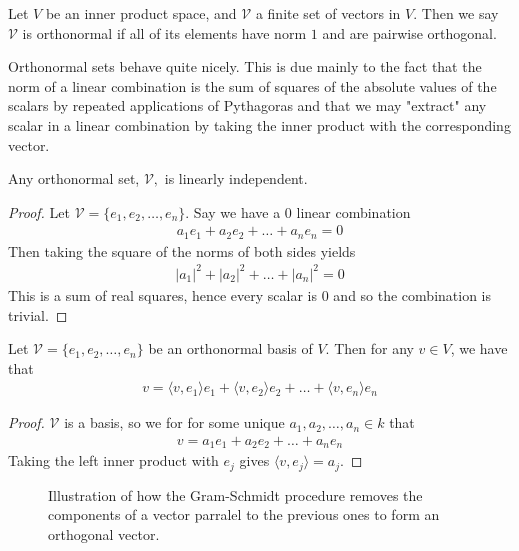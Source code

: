 \documentclass[]{article}
\begin{document}
\begin{defi} 
		Let $V$ be an inner product space, and $\mathcal{V}$ a finite set of vectors in $V$. Then we say $\mathcal{V}$ is orthonormal if all of its elements have norm $1$ and are pairwise orthogonal.
\end{defi}

Orthonormal sets behave quite nicely. This is due mainly to the fact that the norm of a linear combination is the sum of squares of the absolute values of the scalars by repeated applications of Pythagoras and that we may "extract" any scalar in a linear combination by taking the inner product with the corresponding vector.

\begin{thm}
		Any orthonormal set, $\mathcal{V},$ is linearly independent.
\end{thm}

\begin{proof}
		Let $\mathcal{V} = \{e_1, e_2, \ldots, e_n\}$. Say we have a $0$ linear combination 
		\begin{align*}
			a_1 e_1 + a_2 e_2 + \ldots + a_n e_n = 0	
		\end{align*}
		Then taking the square of the norms of both sides yields
		\begin{align*}
				|a_1|^2 + |a_2|^2 + \ldots + |a_n|^2 = 0
		\end{align*}
		This is a sum of real squares, hence every scalar is $0$ and so the combination is trivial.
\end{proof}

\begin{thm}
		Let $\mathcal{V} = \{e_1, e_2, \ldots, e_n\}$ be an orthonormal basis of $V$. Then for any $v \in V$, we have that 
		\begin{align*}
				v = \langle v, e_1 \rangle e_1 + \langle v, e_2 \rangle e_2 + \ldots + \langle v, e_n \rangle e_n
		\end{align*}
\end{thm}

\begin{proof}
		$\mathcal{V}$ is a basis, so we for for some unique $a_1, a_2, \ldots, a_n \in k$ that
		\begin{align*}
				v = a_1 e_1 + a_2 e_2 + \ldots + a_n e_n
		\end{align*}
		Taking the left inner product with $e_j$ gives $\langle v, e_j \rangle = a_j$. 
\end{proof}

\begin{figure}[ht]
\centering
{}
\caption{Illustration of how the Gram-Schmidt procedure removes the components of a vector parralel to the previous ones to form an orthogonal vector.}
\label{fig:gram-schmidt}
\end{figure}
		
\end{document}
